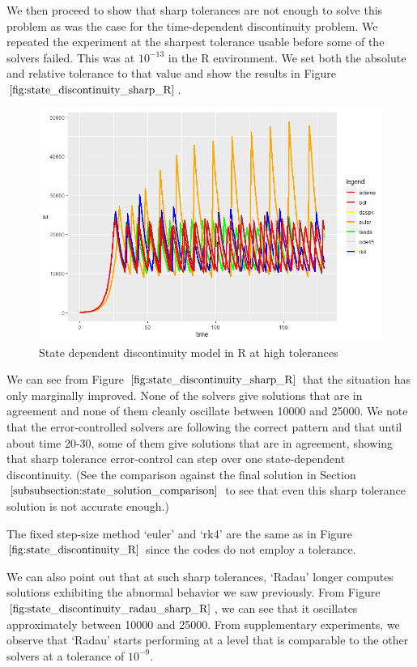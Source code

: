 We then proceed to show that sharp tolerances are not enough to solve this problem as was the case for the time-dependent discontinuity problem. We repeated the experiment at the sharpest tolerance usable before some of the solvers failed. This was at $10^{-13}$ in the R environment. We set both the absolute and relative tolerance to that value and show the results in Figure $\ref{fig:state_discontinuity_sharp_R}$.

\begin{figure}[H]
\centering
\includegraphics[width=0.7\linewidth]{./figures/state_discontinuity_sharp_R}
\caption{State dependent discontinuity model in R at high tolerances}
\label{fig:state_discontinuity_sharp_R}
\end{figure}

We can see from Figure $\ref{fig:state_discontinuity_sharp_R}$ that the situation has only marginally improved. None of the solvers give solutions that are in agreement and none of them cleanly oscillate between 10000 and 25000. We note that the error-controlled solvers are following the correct pattern and that until about time 20-30, some of them give solutions that are in agreement, showing that sharp tolerance error-control can step over one state-dependent discontinuity. (See the comparison against the final solution in Section $\ref{subsubsection:state_solution_comparison}$ to see that even this sharp tolerance solution is not accurate enough.)

The fixed step-size method `euler' and `rk4' are the same as in Figure $\ref{fig:state_discontinuity_R}$ since the codes do not employ a tolerance.

We can also point out that at such sharp tolerances, `Radau' longer computes solutions exhibiting the abnormal behavior we saw previously. From Figure $\ref{fig:state_discontinuity_radau_sharp_R}$, we can see that it oscillates approximately between 10000 and 25000. From supplementary experiments, we observe that `Radau' starts performing at a level that is comparable to the other solvers at a tolerance of $10^{-9}$.

